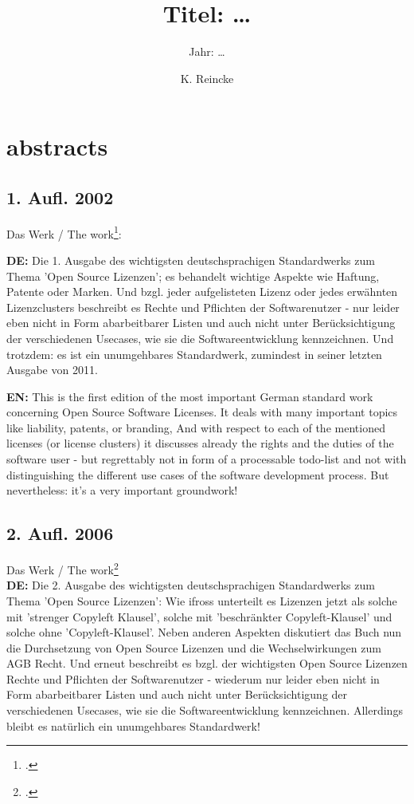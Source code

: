 \documentclass[DIV=calc,BCOR=5mm,11pt,headings=small,oneside,abstract=true, toc=bib]{scrartcl}
\begin{document}

\titlehead{Literaturexzerpt}
\subject{Autor(en): \ldots}
\title{Titel: \ldots}
\subtitle{Jahr: \ldots }
\author{K. Reincke}

\maketitle

\section{abstracts}
\subsection{1. Aufl. 2002}
Das Werk / The work\footcite[][]{JaeMet2002a}:

\textbf{DE:} Die 1. Ausgabe des wichtigsten deutschsprachigen Standardwerks zum Thema
'Open Source Lizenzen'; es behandelt wichtige Aspekte wie Haftung, Patente oder
Marken. Und bzgl. jeder aufgelisteten Lizenz oder jedes erwähnten Lizenzclusters
beschreibt es Rechte und Pflichten der Softwarenutzer - nur leider eben nicht in
Form abarbeitbarer Listen und auch nicht unter Berücksichtigung der
verschiedenen Usecases, wie sie die Softwareentwicklung kennzeichnen. Und
trotzdem: es ist ein unumgehbares Standardwerk, zumindest in seiner letzten
Ausgabe von 2011.

\textbf{EN:} This is the first edition of the most important German standard work
concerning Open Source Software Licenses. It deals with many important topics
like liability, patents, or branding, And with respect to each of the mentioned
licenses (or license clusters) it discusses already the rights and the duties of
the software user - but regrettably not in form of a processable todo-list and
not with distinguishing the different use cases of the software development
process. But nevertheless: it's a very important groundwork!

\subsection{2. Aufl. 2006}
Das Werk / The work\footcite[][]{JaeMet2006a} \\

\textbf{DE:}  Die 2. Ausgabe des wichtigsten deutschsprachigen Standardwerks zum
Thema 'Open Source Lizenzen': Wie ifross unterteilt es Lizenzen jetzt als solche
mit 'strenger Copyleft Klausel', solche mit 'beschränkter Copyleft-Klausel' und
solche ohne 'Copyleft-Klausel'. Neben anderen Aspekten diskutiert das Buch nun
die Durchsetzung von Open Source Lizenzen und die Wechselwirkungen zum AGB
Recht. Und erneut beschreibt es bzgl. der wichtigsten Open Source Lizenzen
Rechte und Pflichten der Softwarenutzer - wiederum nur leider eben nicht in Form
abarbeitbarer Listen und auch nicht unter Berücksichtigung der verschiedenen
Usecases, wie sie die Softwareentwicklung kennzeichnen. Allerdings bleibt es
natürlich ein unumgehbares Standardwerk!
\end{document}
